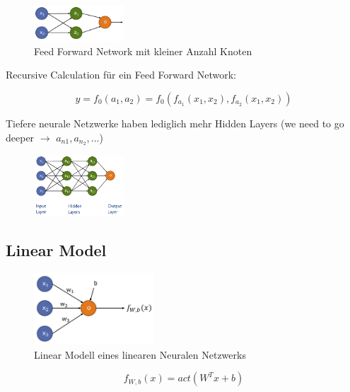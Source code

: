 \documentclass[a4paper]{article}
\begin{document}
		\begin{figure}[htb!]
			\centering
			\includegraphics[width=0.3\textwidth]{img/05_neuronal_networks/ffn_rec_calc.png}
			\caption{Feed Forward Network mit kleiner Anzahl Knoten}
			\label{fig:05_neuronet_ffn_rec_calc}
		\end{figure}
	
		Recursive Calculation für ein Feed Forward Network:
		
		$$y = f_{0}(a_{1}, a_{2}) = f_{0}(f_{a_{1}}(x_{1}, x_{2}), f_{a_{2}}(x_{1}, x_{2}))$$
		
		Tiefere neurale Netzwerke haben lediglich mehr Hidden Layers (we need to go deeper $\rightarrow$ $a_{n1}, a_{n_2}, ...$)
		
		\begin{figure}[htb!]
			\centering
			\includegraphics[width=0.3\textwidth]{img/05_neuronal_networks/dnn.png}
		\end{figure}
		
		\newpage
		
		\subsection{Linear Model}
		
		\begin{figure}[htb!]
			\centering
			\includegraphics[width=0.4\textwidth]{img/05_neuronal_networks/linear_model.png}
			\caption{Linear Modell eines linearen Neuralen Netzwerks}
			\label{fig:05_neuronet_linear_model}
		\end{figure}
	
		$$f_{W,b}(x) = act(W^{T}x + b)$$
		
\end{document}
